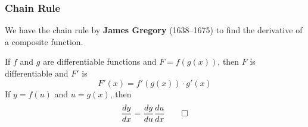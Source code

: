 \subsubsection{Chain Rule}
We have the chain rule by \textbf{James Gregory} (1638--1675) to find the
derivative of a composite function.
\begin{theorem}
    If \(f\) and \(g\) are differentiable functions and \(F=f(g(x))\),
    then \(F\) is differentiable and \(F'\) is
    \[F'(x)=f'(g(x))\cdot g'(x)\]
    If \(y=f(u)\) and \(u=g(x)\), then \[\frac{dy}{dx}=\frac{dy}{du}\frac{du}{dx}\qedhere\]
\end{theorem}